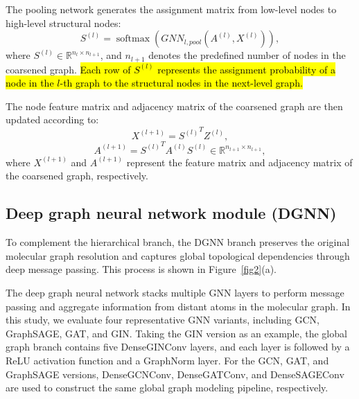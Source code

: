 \documentclass[pdflatex,sn-mathphys-num]{sn-jnl}%
\theoremstyle{thmstyleone}%
\theoremstyle{thmstyletwo}%
\theoremstyle{thmstylethree}%
\begin{document}
The pooling network generates the assignment matrix from low-level nodes to high-level structural nodes:
\begin{equation}
S^{(l)}=\operatorname{softmax}\left(GNN_{l,pool}\left(A^{(l)},X^{(l)}\right)\right),
\end{equation}
where $S^{(l)}\in\mathbb{R}^{n_l\times n_{l+1}}$, and $n_{l+1}$ denotes the predefined number of nodes in the coarsened graph. \hl{Each row of $S^{(l)}$ represents the assignment probability of a node in the $l$-th graph to the structural nodes in the next-level graph.}

The node feature matrix and adjacency matrix of the coarsened graph are then updated according to:
\begin{equation}
X^{(l+1)}={S^{(l)}}^T Z^{(l)},
\end{equation}
\begin{equation}
A^{(l+1)}={S^{(l)}}^T A^{(l)}S^{(l)} \in \mathbb{R}^{n_{l+1}\times n_{l+1}},
\end{equation}
where $X^{(l+1)}$ and $A^{(l+1)}$ represent the feature matrix and adjacency matrix of the coarsened graph, respectively.

\subsection{Deep graph neural network module (DGNN)}\label{subsec:deep_graph_module}

To complement the hierarchical branch, the DGNN branch preserves the original molecular graph resolution and captures global topological dependencies through deep message passing. This process is shown in Figure~\ref{fig2}(a).


The deep graph neural network stacks multiple GNN layers to perform message passing and aggregate information from distant atoms in the molecular graph. In this study, we evaluate four representative GNN variants, including GCN\cite{kipf2016semi}, GraphSAGE\cite{hamilton2017inductive}, GAT\cite{velivckovic2017graph}, and GIN\cite{xu2018powerful}. Taking the GIN version as an example, the global graph branch contains five DenseGINConv layers, and each layer is followed by a ReLU activation function and a GraphNorm layer. For the GCN, GAT, and GraphSAGE versions, DenseGCNConv, DenseGATConv, and DenseSAGEConv are used to construct the same global graph modeling pipeline, respectively.
\end{document}
